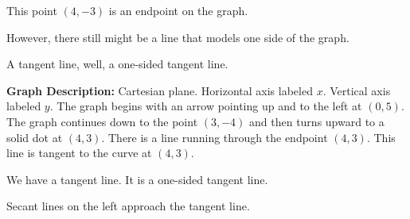 \documentclass{ximera}
\begin{document}
This point $(4, -3)$ is an endpoint on the graph.

However, there still might be a line that models one side of the graph. 

A tangent line, well, a one-sided tangent line. 










\begin{image}
\end{image}

\textbf{Graph Description:} Cartesian plane. Horizontal axis labeled $x$. Vertical axis labeled $y$. The graph begins with an arrow pointing up and to the left at $(0,5)$. The graph continues down to the point $(3,-4)$ and then turns upward to a solid dot at $(4,3)$.  There is a line running through the endpoint $(4,3)$. This line is tangent to the curve at $(4,3)$.  


We have a tangent line.  It is a one-sided tangent line. 




Secant lines on the left approach the tangent line.
\end{document}
